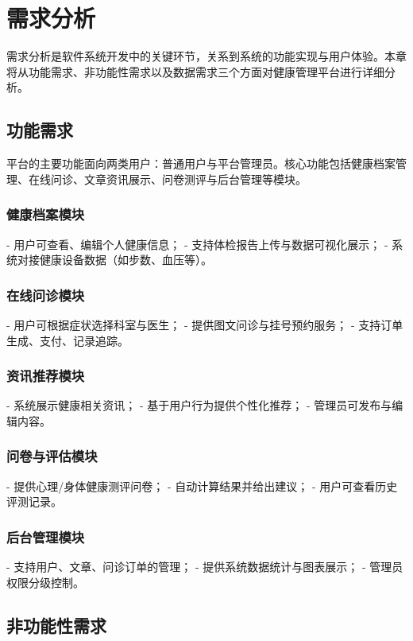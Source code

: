 \section{需求分析}

需求分析是软件系统开发中的关键环节，关系到系统的功能实现与用户体验。本章将从功能需求、非功能性需求以及数据需求三个方面对健康管理平台进行详细分析。

\subsection{功能需求}

平台的主要功能面向两类用户：普通用户与平台管理员。核心功能包括健康档案管理、在线问诊、文章资讯展示、问卷测评与后台管理等模块。

\subsubsection{健康档案模块}
- 用户可查看、编辑个人健康信息；
- 支持体检报告上传与数据可视化展示；
- 系统对接健康设备数据（如步数、血压等）。

\subsubsection{在线问诊模块}
- 用户可根据症状选择科室与医生；
- 提供图文问诊与挂号预约服务；
- 支持订单生成、支付、记录追踪。

\subsubsection{资讯推荐模块}
- 系统展示健康相关资讯；
- 基于用户行为提供个性化推荐；
- 管理员可发布与编辑内容。

\subsubsection{问卷与评估模块}
- 提供心理/身体健康测评问卷；
- 自动计算结果并给出建议；
- 用户可查看历史评测记录。

\subsubsection{后台管理模块}
- 支持用户、文章、问诊订单的管理；
- 提供系统数据统计与图表展示；
- 管理员权限分级控制。

\subsection{非功能性需求}

